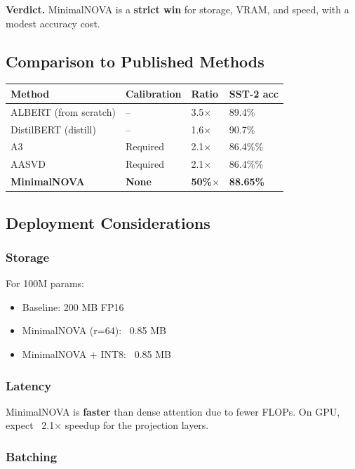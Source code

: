\textbf{Verdict.} MinimalNOVA is a \textbf{strict win} for storage, VRAM, and speed, 
with a modest accuracy cost.

\subsection{Comparison to Published Methods}

\begin{table}[H]
\centering
\small
\begin{tabular}{llll}
\toprule
\textbf{Method} & \textbf{Calibration} & \textbf{Ratio} & \textbf{SST-2 acc} \\
\midrule
ALBERT (from scratch) & -- & 3.5$\times$ & 89.4\% \\
DistilBERT (distill) & -- & 1.6$\times$ & 90.7\% \\
A3 & Required & 2.1$\times$ & 86.4\%\% \\
AASVD & Required & 2.1$\times$ & 86.4\%\% \\
\textbf{MinimalNOVA} & \textbf{None} & \textbf{50\%$\times$} & \textbf{88.65\%} \\
\bottomrule
\end{tabular}
\end{table}

\subsection{Deployment Considerations}

\subsubsection{Storage}

For 100M params:
\begin{itemize}
\item Baseline: 200 MB FP16
\item MinimalNOVA (r=64): ~0.85 MB
\item MinimalNOVA + INT8: ~0.85 MB

\end{itemize}
\subsubsection{Latency}

MinimalNOVA is \textbf{faster} than dense attention due to fewer FLOPs. 
On GPU, expect ~2.1$\times$ speedup for the projection layers.

\subsubsection{Batching}

